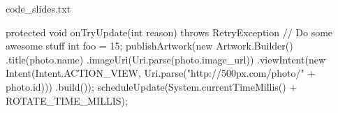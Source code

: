 \documentclass[aspectratio=169]{beamer}
\begin{document}
\begin{frame}
\end{frame}

\begin{frame}
\begin{code}[language=Java, emph={Artwork,Builder,Intent}]
code_slides.txt

protected void onTryUpdate(int reason) throws RetryException {
    // Do some awesome stuff
    int foo = 15;
    publishArtwork(new Artwork.Builder()
            .title(photo.name)
            .imageUri(Uri.parse(photo.image_url))
            .viewIntent(new Intent(Intent.ACTION_VIEW,
                    Uri.parse("http://500px.com/photo/" + photo.id)))
            .build());
    scheduleUpdate(System.currentTimeMillis() + ROTATE_TIME_MILLIS);
}
\end{code}
\end{frame}
\end{document}
